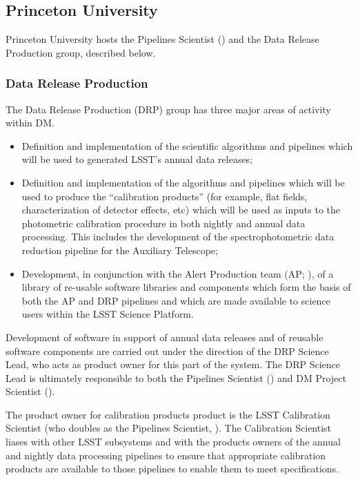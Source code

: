 \subsection {Princeton University}\label{sect:princeton}

Princeton University hosts the Pipelines Scientist () and the Data Release Production group, described below.

\subsubsection{Data Release Production \label{sect:drp}}

The Data Release Production (DRP) group has three major areas of activity within DM.

\begin{itemize}

  \item{Definition and implementation of the scientific algorithms and pipelines which will be used to generated LSST's annual data releases;}

  \item{Definition and implementation of the algorithms and pipelines which will be used to produce the ``calibration products'' (for example, flat fields, characterization of detector effects, etc) which will be used as inputs to the photometric calibration procedure in both nightly and annual data processing. This includes the development of the spectrophotometric data reduction pipeline for the Auxiliary Telescope;}

  \item{Development, in conjunction with the Alert Production team (AP; ), of a library of re-usable software libraries and components which form the basis of both the AP and DRP pipelines and which are made available to science users within the LSST Science Platform.}

\end{itemize}

Development of software in support of annual data releases and of reusable software components are carried out under the direction of the DRP Science Lead, who acts as product owner for this part of the system.
The DRP Science Lead is ultimately responsible to both the Pipelines Scientist () and DM Project Scientist ().

The product owner for calibration products product is the LSST Calibration Scientist (who doubles as the Pipelines Scientist, ).
The Calibration Scientist liases with other LSST subsystems and with the products owners of the annual and nightly data processing pipelines to ensure that appropriate calibration products are available to those pipelines to enable them to meet specifications.

